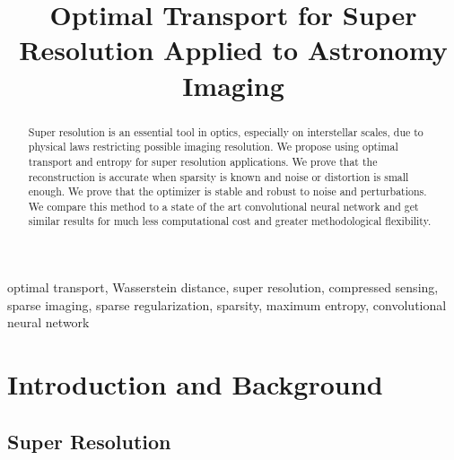\documentclass[conference]{IEEEtran}
\begin{document}

\title{Optimal Transport for Super Resolution Applied to Astronomy Imaging}

\author{
\and
{}
}

\maketitle

\begin{abstract}
Super resolution is an essential tool in optics, especially on interstellar scales, due to physical laws restricting possible imaging resolution. We propose using optimal transport and entropy for super resolution applications. We prove that the reconstruction is accurate when sparsity is known and noise or distortion is small enough. We prove that the optimizer is stable and robust to noise and perturbations. We compare this method to a state of the art convolutional neural network and get similar results for much less computational cost and greater methodological flexibility.  
\end{abstract}

\begin{IEEEkeywords}
optimal transport, Wasserstein distance, super resolution, compressed sensing, sparse imaging, sparse regularization, sparsity, maximum entropy, convolutional neural network
\end{IEEEkeywords}




\section{Introduction and Background}

\subsection{Super Resolution}
\end{document}
